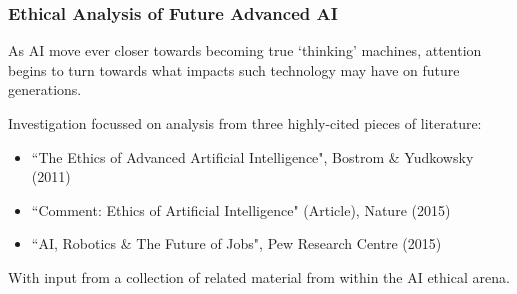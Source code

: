 \documentclass[10pt, compress]{beamer}
\begin{document}
%  
%   
%   
%    
%    
%    
%     
%

\begin{frame}[fragile]
  \frametitle{Ethical Analysis of Future Advanced AI}
  
   \small{ 
   
  	As AI move ever closer towards becoming true `thinking' machines, attention begins to turn towards what impacts such technology may have on future generations.
  	
  	Investigation focussed on analysis from three highly-cited pieces of literature:
  	
  	\begin{itemize}
    	\item ``The Ethics of Advanced Artificial Intelligence",  Bostrom \& Yudkowsky (2011)
    	\item ``Comment: Ethics of Artificial Intelligence" (Article), Nature (2015)
    	\item ``AI, Robotics \& The Future of Jobs", Pew Research Centre (2015)
    \end{itemize}
    
    With input from a collection of related material from within the AI ethical arena. 
     
     }

\end{frame}
\end{document}
